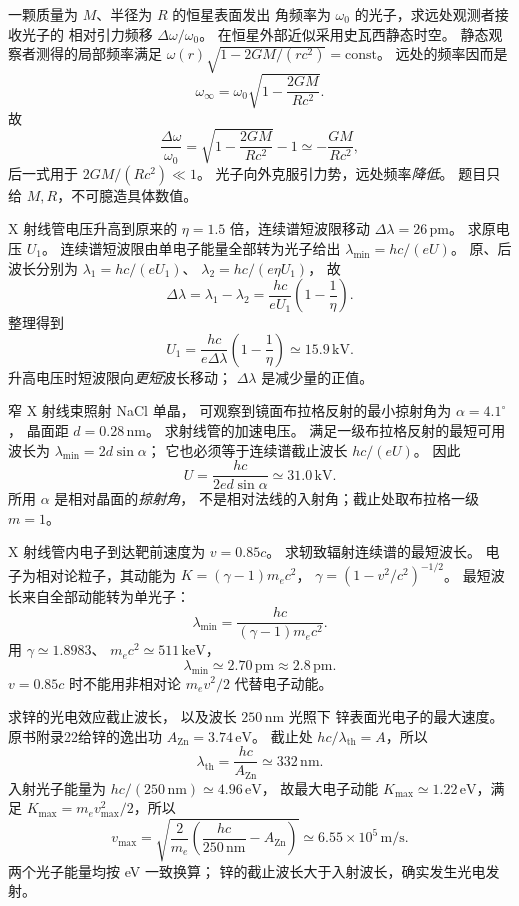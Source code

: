 
一颗质量为 $M$、半径为 $R$ 的恒星表面发出
角频率为 $\omega_0$ 的光子，求远处观测者接收光子的
相对引力频移 $\Delta\omega/\omega_0$。
\exsolution
在恒星外部近似采用史瓦西静态时空。
静态观察者测得的局部频率满足
$\omega(r)\sqrt{1-2GM/(rc^2)}=\mathrm{const}$。
远处的频率因而是
\[
 \omega_\infty=\omega_0\sqrt{1-\frac{2GM}{Rc^2}}.
\]
故
\[
 \boxed{\frac{\Delta\omega}{\omega_0}
 =\sqrt{1-\frac{2GM}{Rc^2}}-1
 \simeq-\frac{GM}{Rc^2}},
\]
后一式用于 $2GM/(Rc^2)\ll1$。
\excheck 光子向外克服引力势，远处频率\emph{降低}。
题目只给 $M,R$，不可臆造具体数值。

X 射线管电压升高到原来的
$\eta=1.5$ 倍，连续谱短波限移动
$\Delta\lambda=26\,\mathrm{pm}$。
求原电压 $U_1$。
\exsolution
连续谱短波限由单电子能量全部转为光子给出
$\lambda_{\min}=hc/(eU)$。
原、后波长分别为
$\lambda_1=hc/(eU_1)$、
$\lambda_2=hc/(e\eta U_1)$，
故
\[
 \Delta\lambda=\lambda_1-\lambda_2
 =\frac{hc}{eU_1}\left(1-\frac1\eta\right).
\]
整理得到
\[
 \boxed{U_1=\frac{hc}{e\Delta\lambda}
 \left(1-\frac1\eta\right)
 \simeq15.9\,\mathrm{kV}}.
\]
\excheck 升高电压时短波限向\emph{更短}波长移动；
$\Delta\lambda$ 是减少量的正值。

窄 X 射线束照射 NaCl 单晶，
可观察到镜面布拉格反射的最小掠射角为
$\alpha=4.1^\circ$，
晶面距 $d=0.28\,\mathrm{nm}$。
求射线管的加速电压。
\exsolution
满足一级布拉格反射的最短可用波长为
$\lambda_{\min}=2d\sin\alpha$；
它也必须等于连续谱截止波长
$hc/(eU)$。
因此
\[
 \boxed{U=\frac{hc}{2ed\sin\alpha}
 \simeq31.0\,\mathrm{kV}}.
\]
\excheck 所用 $\alpha$ 是相对晶面的\emph{掠射角}，
不是相对法线的入射角；截止处取布拉格一级 $m=1$。

X 射线管内电子到达靶前速度为 $v=0.85c$。
求轫致辐射连续谱的最短波长。
\exsolution
电子为相对论粒子，其动能为
$K=(\gamma-1)m_ec^2$，
$\gamma=(1-v^2/c^2)^{-1/2}$。
最短波长来自全部动能转为单光子：
\[
 \boxed{\lambda_{\min}=
 \frac{hc}{(\gamma-1)m_ec^2}}.
\]
用 $\gamma\simeq1.8983$、
$m_ec^2\simeq511\,\mathrm{keV}$，
\[
 \boxed{\lambda_{\min}\simeq2.70\,\mathrm{pm}
 \approx2.8\,\mathrm{pm}}.
\]
\excheck $v=0.85c$ 时不能用非相对论
$m_ev^2/2$ 代替电子动能。

求锌的光电效应截止波长，
以及波长 $250\,\mathrm{nm}$ 光照下
锌表面光电子的最大速度。
\exsolution
原书附录22给锌的逸出功
$A_{\mathrm{Zn}}=3.74\,\mathrm{eV}$。
截止处 $hc/\lambda_{\mathrm{th}}=A$，所以
\[
 \boxed{\lambda_{\mathrm{th}}=
 \frac{hc}{A_{\mathrm{Zn}}}\simeq332\,\mathrm{nm}}.
\]
入射光子能量为
$hc/(250\,\mathrm{nm})\simeq4.96\,\mathrm{eV}$，
故最大电子动能
$K_{\max}\simeq1.22\,\mathrm{eV}$，满足
$K_{\max}=m_ev_{\max}^2/2$，所以
\[
 \boxed{v_{\max}=
 \sqrt{\frac{2}{m_e}
 \left(\frac{hc}{250\,\mathrm{nm}}-A_{\mathrm{Zn}}\right)}
 \simeq6.55\times10^5\,\mathrm{m/s}}.
\]
\excheck 两个光子能量均按 eV 一致换算；
锌的截止波长大于入射波长，确实发生光电发射。

